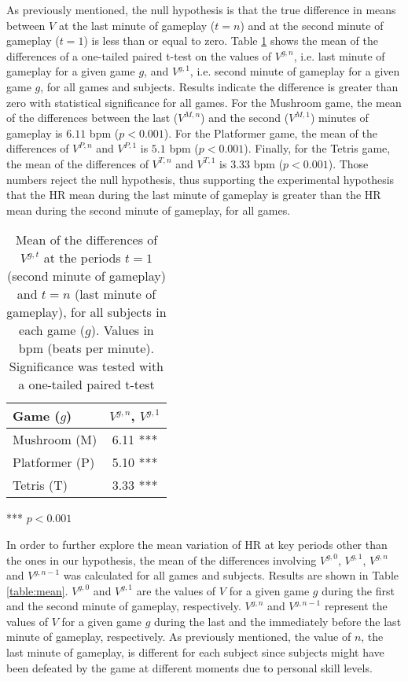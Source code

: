 As previously mentioned, the null hypothesis is that the true difference in means between $V$ at the last minute of gameplay ($t=n$) and at the second minute of gameplay ($t=1$) is less than or equal to zero. Table \ref{table:proof} shows the mean of the differences of a one-tailed paired t-test on the values of $V^{g,n}$, i.e. last minute of gameplay for a given game $g$, and $V^{g,1}$, i.e. second minute of gameplay for a given game $g$, for all games and subjects. Results indicate the difference is greater than zero with statistical significance for all games. For the Mushroom game, the mean of the differences between the last ($V^{M,n}$) and the second ($V^{M,1}$) minutes of gameplay is $6.11$ bpm ($p < 0.001$). For the Platformer game, the mean of the differences of $V^{P,n}$ and $V^{P,1}$ is $5.1$ bpm ($p < 0.001$). Finally, for the Tetris game, the mean of the differences of $V^{T,n}$ and $V^{T,1}$ is $3.33$ bpm ($p < 0.001$). Those numbers reject the null hypothesis, thus supporting the experimental hypothesis that the HR mean during the last minute of gameplay is greater than the HR mean during the second minute of gameplay, for all games.

\begin{table}
    \caption{Mean of the differences of $V^{g,t}$ at the periods $t=1$ (second minute of gameplay) and $t=n$ (last minute of gameplay), for all subjects in each game ($g$). Values in bpm (beats per minute). Significance was tested with a one-tailed paired t-test}
    \label{table:proof}
    \centering
  \begin{threeparttable}
     \begin{tabular}{lc}
        \toprule%
        \textbf{Game ($g$)} & \textbf{$V^{g,n}$, $V^{g,1}$} \\
        \midrule%
        Mushroom (M) & 6.11 ***  \\
        Platformer (P) & 5.10 ***  \\
        Tetris (T) & 3.33 *** \\
        \bottomrule%
     \end{tabular}
    \begin{tablenotes}
      \small
      \item[***]{$p < 0.001$}
    \end{tablenotes}
  \end{threeparttable}
\end{table}

In order to further explore the mean variation of HR at key periods other than the ones in our hypothesis, the mean of the differences involving $V^{g,0}$, $V^{g,1}$, $V^{g,n}$ and $V^{g,n-1}$ was calculated for all games and subjects. Results are shown in Table \ref{table:mean}. $V^{g,0}$ and $V^{g,1}$ are the values of $V$ for a given game $g$ during the first and the second minute of gameplay, respectively. $V^{g,n}$ and $V^{g,n-1}$ represent the values of $V$ for a given game $g$ during the last and the immediately before the last minute of gameplay, respectively. As previously mentioned, the value of $n$, the last minute of gameplay, is different for each subject since subjects might have been defeated by the game at different moments due to personal skill levels.

